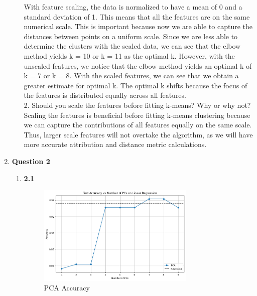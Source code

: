\documentclass[12pt]{article}
\begin{document}
\begin{enumerate}
\begin{enumerate}
    With feature scaling, the data is normalized to have a mean of 0 and a standard deviation of 1. This means that all the features are on the same numerical scale. This is important because now we are able to capture the distances between points on a uniform scale. Since we are less able to determine the clusters with the scaled data, we can see that the elbow method
    yields k = 10 or k = 11 as the optimal k. However, with the unscaled features, we notice that the elbow method yields an optimal k of k = 7 or k = 8. With the scaled features, we can see that we obtain a greater estimate for optimal k. The optimal k shifts because the focus of the features is distributed equally across all features. \\


    2. Should you scale the features before fitting k-means? Why or why not? \\

    Scaling the features is beneficial before fitting k-means clustering because we can capture the contributions of all features equally on the same scale. Thus, larger scale features will not overtake the algorithm, as we will have more accurate attribution and distance metric calculations. 
  

  \end{enumerate}

  \item \textbf{Question 2}
  \begin{enumerate}
    \item \textbf{2.1}
    \begin{figure}[H]
      \centering 
      \includegraphics[width=0.75\textwidth]{2_1.png}
      \caption{PCA Accuracy}
    \end{figure}


\end{enumerate}
\end{enumerate}
\end{document}
